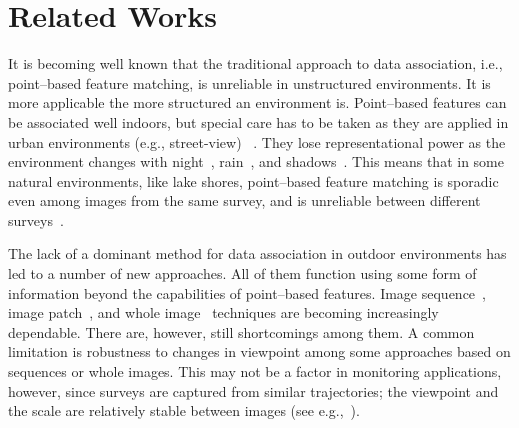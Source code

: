 \section{Related Works}


It is becoming well known that the traditional approach to data association, i.e., point--based feature matching, is unreliable in unstructured environments. It is more applicable the more structured an environment is. Point--based features can be associated well indoors, but special care has to be taken as they are applied in urban environments (e.g., street-view) ~\cite{beall2014, stumm2013}. They lose representational power as the environment changes with night~\cite{nelson2015}, rain~\cite{cord2014}, and shadows~\cite{corke2013}. This means that in some natural environments, like lake shores, point--based feature matching is sporadic even among images from the same survey, and is unreliable between different surveys~\cite{griffith2014iser}. 

The lack of a dominant method for data association in outdoor environments has led to a number of new approaches. All of them function using some form of information beyond the capabilities of point--based features. Image sequence~\cite{milford2012seqslam, cummins2008fab, milford2004, churchill2013, naseer2015}, image patch~\cite{mcmanus2014, Sunderhauf2015a}, and whole image~\cite{arroyo2015, neubert2015superpixel} techniques are becoming increasingly dependable. There are, however, still shortcomings among them. A common limitation is robustness to changes in viewpoint among some approaches based on sequences or whole images. This may not be a factor in monitoring applications, however, since surveys are captured from similar trajectories; the viewpoint and the scale are relatively stable between images (see e.g.,~\cite{milford2014}).

